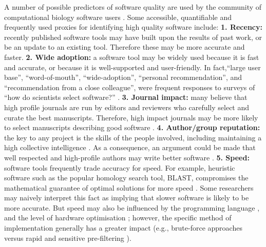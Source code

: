 \documentclass{bmcart}
\begin{document}
A number of possible predictors of software quality are used by the
community of computational biology software users \cite{Hannay2009-cf,Joppa2013-vj,Loman2015-bw}. 
Some accessible, quantifiable and frequently used proxies for identifying high quality
software include: \textbf{1. Recency:} recently published software
tools may have built upon the results of past work, or be an update to
an existing tool. Therefore these may be more accurate and
faster. \textbf{2. Wide adoption:} a software tool may be widely used
because it is fast and accurate, or because it is well-supported and
user-friendly. In fact,``large user base'', ``word-of-mouth'',
``wide-adoption'', ``personal recommendation'', and ``recommendation from a
close colleague'', were frequent responses to surveys of ``how do
scientists select software?''
\cite{Hannay2009-cf,Joppa2013-vj,Loman2015-bw}. \textbf{3. Journal
impact:} {\color{red}many believe that} high profile journals are run by editors and reviewers who
carefully select and curate the best manuscripts. Therefore, high
impact journals may be more likely to select manuscripts describing
good software \cite{Garfield1955-wf}. \textbf{4. Author/group
reputation:} the key to any project is the skills of the people
involved, including maintaining a high collective intelligence
\cite{Joppa2013-vj,Woolley2010-ld,Cheruvelil2014-xn}. As a
consequence, an argument could be made that well respected and
high-profile authors may write better software
\cite{Hirsch2005-mt,Bornmann2008-il}. \textbf{5. Speed:} software tools
frequently trade accuracy for speed. For example, heuristic
software such as the popular homology search tool, BLAST, compromises
the mathematical guarantee of optimal solutions for more speed
\cite{Altschul1990-ht,Altschul1997-ga}. Some researchers may naively
interpret this fact as implying that slower software is likely to be more
accurate. But speed may also be influenced by the programming language
\cite{Fourment2008-vl}, and the level of hardware optimisation
\cite{Farrar2007-ky,Dematte2010-ph};
{\color{red}however}, the specific method of implementation generally has a greater impact (e.g., brute-force approaches versus
rapid and sensitive pre-filtering
\cite{Schaeffer1989-mu,Papadimitriou_undated-bo,leiserson2020there}).
\end{document}
